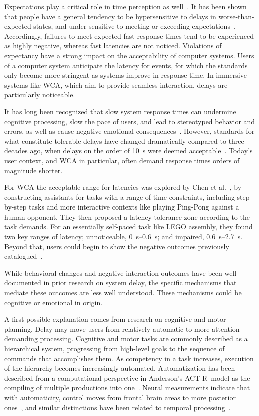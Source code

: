 Expectations play a critical role in time perception as well~\cite{zakay1995attentional,zakay1996role}.
It has been shown that people have a general tendency to be hypersensitive to delays in worse-than-expected states, and under-sensitive to meeting or exceeding expectations~\cite{loewenstein1992anomalies}.
Accordingly, failures to meet expected fast response times tend to be experienced as highly negative, whereas fast latencies are not noticed.
Violations of expectancy have a strong impact on the acceptability of computer systems.
Users of a computer system anticipate the latency for events, for which the standards only become more stringent as systems improve in response time.
In immersive systems like \gls{WCA}, which aim to provide seamless interaction, delays are particularly noticeable.

It has long been recognized that slow system response times can undermine cognitive processing, slow the pace of users, and lead to stereotyped behavior and errors, as well as cause negative emotional consequences~\cite{dabrowski201140}.
However, standards for what constitute tolerable delays have changed dramatically compared to three decades ago, when delays on the order of \SI{10}{\second} were deemed acceptable~\cite{nielsen1994usability, shneiderman2016designing, seow2008designing}.
Today's user context, and \gls{WCA} in particular, often demand response times orders of magnitude shorter.

For \gls{WCA} the acceptable range for latencies was explored by Chen et al.~\cite{chen2017empirical}, by constructing assistants for tasks with a range of time constraints, including step-by-step tasks and more interactive contexts like playing Ping-Pong against a human opponent.
They then proposed a latency tolerance zone according to the task demands.
For an essentially self-paced task like LEGO assembly, they found two key ranges of latency; unnoticeable, \SIrange{0}{0.6}{\second}; and impaired, \SIrange{0.6}{2.7}{\second}.
Beyond that, users could begin to show the negative outcomes previously catalogued~\cite{dabrowski201140}.

While behavioral changes and negative interaction outcomes have been well documented in prior research on system delay, the specific mechanisms that mediate these outcomes are less well understood.
These mechanisms could be cognitive or emotional in origin.

A first possible explanation comes from research on cognitive and motor planning.
Delay may move users from relatively automatic to more attention-demanding processing.
Cognitive and motor tasks are commonly described as a hierarchical system, progressing from high-level goals to the sequence of commands that accomplishes them.
As competency in a task increases, execution of the hierarchy becomes increasingly automated.
Automatization has been described from a computational perspective in {Anderson's ACT-R}~model as the compiling of multiple productions into one~\cite{neves1981knowledge}.
Neural measurements indicate that with automaticity, control moves from frontal brain areas to more posterior ones~\cite{jeon2015degree,puttemans2005changes}, and similar distinctions have been related to temporal processing~\cite{lewis2003distinct,koch2009neural,lee2019limiting}.

